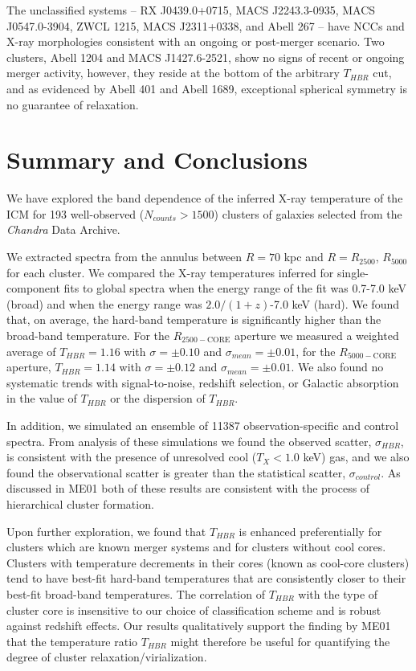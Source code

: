\documentclass{emulateapj}
\newcommand{\rtwf}{$R_{2500-\text{CORE}}$ }
\newcommand{\rfif}{$R_{5000-\text{CORE}}$ }
\begin{document}
The unclassified systems -- RX J0439.0+0715, MACS J2243.3-0935, MACS
J0547.0-3904, ZWCL 1215, MACS J2311+0338, and Abell 267 -- have NCCs and
X-ray morphologies consistent with an ongoing or post-merger
scenario. Two clusters, Abell 1204 and MACS J1427.6-2521, show no
signs of recent or ongoing merger activity, however, they reside at
the bottom of the arbitrary $T_{HBR}$ cut, and as evidenced by Abell 401 and
Abell 1689, exceptional spherical symmetry is no guarantee of
relaxation.

\section{Summary and Conclusions}\label{sec:summary}

We have explored the band dependence of the inferred X-ray temperature
of the ICM for 193 well-observed ($N_{counts} > 1500$) clusters of
galaxies selected from the {\it Chandra} Data Archive.

We extracted spectra from the annulus between $R=70$ kpc and
$R=R_{2500}$, $R_{5000}$ for each cluster. We compared the X-ray
temperatures inferred for single-component fits to global spectra
when the energy range of the fit was 0.7-7.0 keV (broad) and when the
energy range was $2.0/(1+z)$-7.0 keV (hard). We found that, on
average, the hard-band temperature is significantly higher than
the broad-band temperature. For the \rtwf aperture we measured a
weighted average of $T_{HBR} = 1.16$ with $\sigma = \pm 0.10$ and
$\sigma_{mean} = \pm 0.01$, for the \rfif aperture, $T_{HBR} = 1.14$ with
$\sigma = \pm 0.12$ and $\sigma_{mean} = \pm 0.01$. We also found no
systematic trends with signal-to-noise, redshift selection, or
Galactic absorption in the value of $T_{HBR}$ or the dispersion of
$T_{HBR}$.

In addition, we simulated an ensemble of 11387 observation-specific
and control spectra. From analysis of these simulations we found the
observed scatter, $\sigma_{HBR}$, is consistent with the presence of
unresolved cool ($T_X < 1.0$ keV) gas, and we also found the
observational scatter is greater than the statistical scatter,
$\sigma_{control}$. As discussed in ME01 both of these results are
consistent with the process of hierarchical cluster formation.

Upon further exploration, we found that $T_{HBR}$ is enhanced
preferentially for clusters which are known merger systems and for
clusters without cool cores. Clusters with temperature decrements in
their cores (known as cool-core clusters) tend to have best-fit
hard-band temperatures that are consistently closer to their
best-fit broad-band temperatures. The correlation of $T_{HBR}$ with
the type of cluster core is insensitive to our choice of
classification scheme and is robust against redshift effects. Our
results qualitatively support the finding by ME01 that the temperature
ratio $T_{HBR}$ might therefore be useful for quantifying the degree
of cluster relaxation/virialization.
\end{document}

